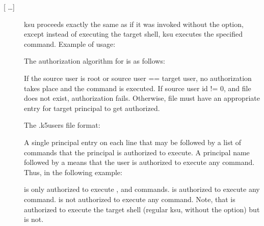 \documentclass[letterpaper,10pt,english]{sphinxmanual}
\begin{document}
\begin{description}
\item[{  {[} …{]}}] \leavevmode
\sphinxAtStartPar
ksu proceeds exactly the same as if it was invoked without the
 option, except instead of executing the target shell, ksu
executes the specified command. Example of usage:

\begin{sphinxVerbatim}[commandchars=\\\{\}]
    
\end{sphinxVerbatim}

\sphinxAtStartPar
The authorization algorithm for  is as follows:

\sphinxAtStartPar
If the source user is root or source user == target user, no
authorization takes place and the command is executed.  If source
user id != 0, and  file does not exist,
authorization fails.  Otherwise,  file
must have an appropriate entry for target principal to get
authorized.

\sphinxAtStartPar
The .k5users file format:

\sphinxAtStartPar
A single principal entry on each line that may be followed by a
list of commands that the principal is authorized to execute.  A
principal name followed by a \sphinxcode{\sphinxupquote{*}} means that the user is
authorized to execute any command.  Thus, in the following
example:

\begin{sphinxVerbatim}[commandchars=\\\{\}]
   
 
\end{sphinxVerbatim}

\sphinxAtStartPar
{} is only authorized to execute ,
 and  commands.   is
authorized to execute any command.   is
not authorized to execute any command.  Note, that
 is authorized to execute the target
shell (regular ksu, without the  option) but
 is not.


\end{description}
\end{document}
